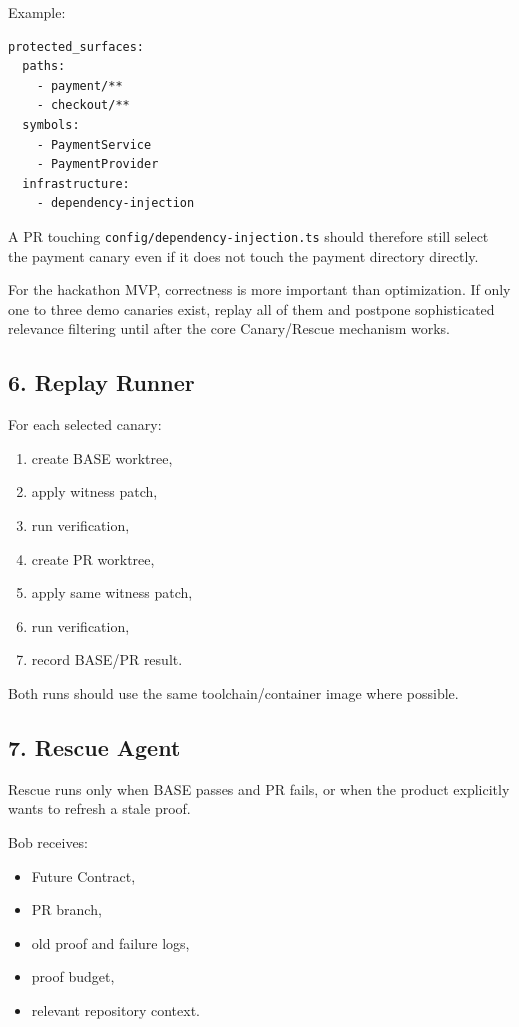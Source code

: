 \documentclass[12pt]{article}
\begin{document}
Example:

\begin{lstlisting}
protected_surfaces:
  paths:
    - payment/**
    - checkout/**
  symbols:
    - PaymentService
    - PaymentProvider
  infrastructure:
    - dependency-injection
\end{lstlisting}

A PR touching \texttt{config/dependency-injection.ts} should therefore still select the payment canary even if it does not touch the payment directory directly.

For the hackathon MVP, correctness is more important than optimization. If only one to three demo canaries exist, replay all of them and postpone sophisticated relevance filtering until after the core Canary/Rescue mechanism works.

\subsection{6. Replay Runner}

For each selected canary:

\begin{enumerate}
    \item create BASE worktree,
    \item apply witness patch,
    \item run verification,
    \item create PR worktree,
    \item apply same witness patch,
    \item run verification,
    \item record BASE/PR result.
\end{enumerate}

Both runs should use the same toolchain/container image where possible.

\subsection{7. Rescue Agent}

Rescue runs only when BASE passes and PR fails, or when the product explicitly wants to refresh a stale proof.

Bob receives:

\begin{itemize}
    \item Future Contract,
    \item PR branch,
    \item old proof and failure logs,
    \item proof budget,
    \item relevant repository context.
\end{itemize}
\end{document}
